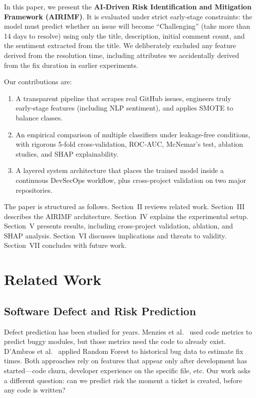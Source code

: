 \documentclass[conference]{IEEEtran}
\begin{document}
In this paper, we present the \textbf{AI‑Driven Risk Identification and Mitigation Framework (AIRIMF)}. It is evaluated under strict early‑stage constraints: the model must predict whether an issue will become ``Challenging'' (take more than 14 days to resolve) using only the title, description, initial comment count, and the sentiment extracted from the title. We deliberately excluded any feature derived from the resolution time, including attributes we accidentally derived from the fix duration in earlier experiments.

Our contributions are:
\begin{enumerate}
    \item A transparent pipeline that scrapes real GitHub issues, engineers truly early‑stage features (including NLP sentiment), and applies SMOTE to balance classes.
    \item An empirical comparison of multiple classifiers under leakage‑free conditions, with rigorous 5‑fold cross‑validation, ROC‑AUC, McNemar's test, ablation studies, and SHAP explainability.
    \item A layered system architecture that places the trained model inside a continuous DevSecOps workflow, plus cross‑project validation on two major repositories.
\end{enumerate}

The paper is structured as follows. Section~II reviews related work. Section~III describes the AIRIMF architecture. Section~IV explains the experimental setup. Section~V presents results, including cross‑project validation, ablation, and SHAP analysis. Section~VI discusses implications and threats to validity. Section~VII concludes with future work.

\section{Related Work}

\subsection{Software Defect and Risk Prediction}
Defect prediction has been studied for years. Menzies et al.~\cite{menzies2007} used code metrics to predict buggy modules, but those metrics need the code to already exist. D'Ambros et al.~\cite{dambros2012} applied Random Forest to historical bug data to estimate fix times. Both approaches rely on features that appear only after development has started—code churn, developer experience on the specific file, etc. Our work asks a different question: can we predict risk the moment a ticket is created, before any code is written?
\end{document}
